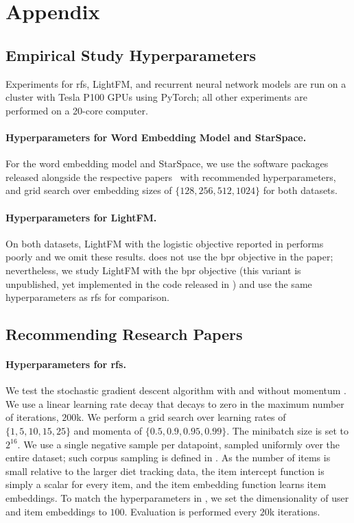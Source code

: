 \section{Appendix}
\subsection{Empirical Study Hyperparameters}
\label{sec:appendix-empirical}

Experiments for \gls{rfs}, LightFM, and recurrent neural network models are run on a cluster with Tesla P100 GPUs using PyTorch; all other experiments are performed on a 20-core computer.

\paragraph{Hyperparameters for Word Embedding Model and StarSpace.} For the word embedding model and StarSpace, we use the software packages released alongside the respective papers~\citep{bojanowski2017enriching,wu2018starspace:} with recommended hyperparameters, and grid search over embedding sizes of $\{128, 256, 512, 1024\}$ for both datasets.

\paragraph{Hyperparameters for LightFM.} On both datasets, LightFM with the logistic objective reported in \citet{kula2015metadata} performs poorly and we omit these results. \citet{kula2015metadata} does not use the \gls{bpr} objective in the paper; nevertheless, we study LightFM with the \gls{bpr} objective (this variant is unpublished, yet implemented in the code released in \citep{kula2015metadata}) and use the same hyperparameters as \gls{rfs} for comparison.

\subsection{Recommending Research Papers}
\label{sec:hyper-arxiv}
\paragraph{Hyperparameters for \acrshort{rfs}.} We test the stochastic gradient descent algorithm with and without momentum \citep{sutskever2013on-the-importance}. We use a linear learning rate decay that decays to zero in the maximum number of iterations, $200$k. We perform a grid search over learning rates of $\{1, 5, 10, 15, 25\}$ and momenta of $\{0.5, 0.9, 0.95, 0.99\}$. The minibatch size is set to $2^{16}$. We use a single negative sample per datapoint, sampled uniformly over the entire dataset; such corpus sampling is defined in . As the number of items is small relative to the larger diet tracking data, the item intercept function is simply a scalar for every item, and the item embedding function learns item embeddings. To match the hyperparameters in \citet{gopalan2014content-based}, we set the dimensionality of user and item embeddings to $100$. Evaluation is performed every $20$k iterations.


